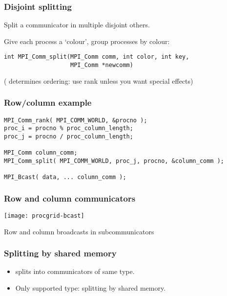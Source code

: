 

\begin{frame}[containsverbatim]\frametitle{Disjoint splitting}
  Split a communicator in multiple disjoint others.
  
Give each process a `colour', group processes by colour:
\lstset{language=C}
\begin{lstlisting}
int MPI_Comm_split(MPI_Comm comm, int color, int key, 
                   MPI_Comm *newcomm)  
\end{lstlisting}
( determines ordering: use rank unless you want special effects)
\end{frame}

\begin{frame}[containsverbatim]\frametitle{Row/column example}
\begin{lstlisting}
MPI_Comm_rank( MPI_COMM_WORLD, &procno );
proc_i = procno % proc_column_length;
proc_j = procno / proc_column_length;

MPI_Comm column_comm;
MPI_Comm_split( MPI_COMM_WORLD, proc_j, procno, &column_comm );

MPI_Bcast( data, ... column_comm );
\end{lstlisting}
\end{frame}

\begin{frame}\frametitle{Row and column communicators}
  \texttt{[image: procgrid-bcast]}

  Row and column broadcasts in subcommunicators
\end{frame}

\begin{exerciseframe}[procgrid]
  \footnotesize
  
\end{exerciseframe}

\begin{longcourse}
  \begin{exerciseframe}
    
  \end{exerciseframe}
\end{longcourse}

\begin{frame}[containsverbatim]\frametitle{Splitting by shared memory}
  \begin{itemize}
  \item
     splits into communicators of same type.
  \item Only supported type:  splitting by
    shared memory.
  \end{itemize}

\end{frame}

